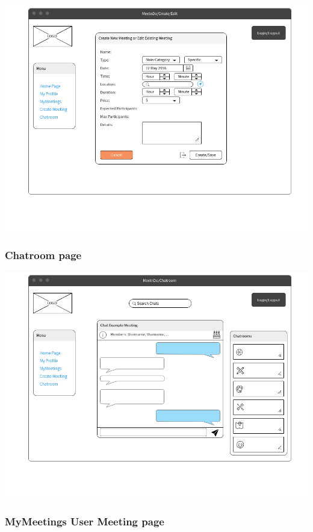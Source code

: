\documentclass[conference]{IEEEtran}
\begin{document}
\includegraphics[scale=0.3]{mockups/Create_edit}

\subsubsection{Chatroom page} \hspace{10cm}

\includegraphics[scale=0.3]{pics/mockups/Chatroom.png}

\subsubsection{MyMeetings User Meeting page} \hspace{10cm}
\end{document}
